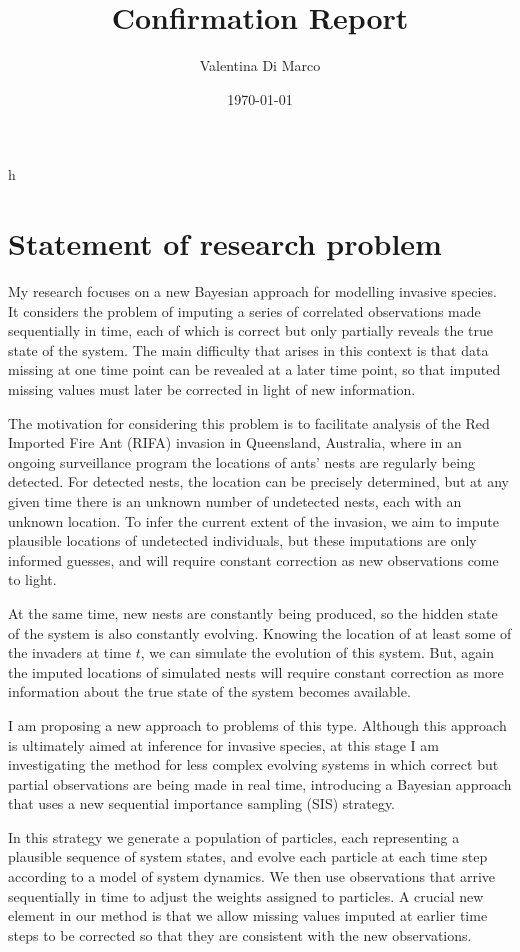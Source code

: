 h\documentclass[11pt,a4paper]{article}
\title{Confirmation Report}
\author{Valentina Di Marco}
\date{\today}
\begin{document}
 \maketitle

\section{Statement of research problem}

My research focuses on a new Bayesian approach for modelling invasive species. It considers the problem of imputing a series of correlated observations made sequentially in time, each of which is correct but only partially reveals the true state of the system. The main difficulty that arises in this context is that data missing at one time point can be revealed at a later time point, so that imputed missing values must later be corrected in light of new information.

The motivation for considering this problem is to facilitate analysis of the Red Imported Fire Ant (RIFA) invasion in Queensland, Australia, where in an ongoing surveillance program the locations of ants’ nests are regularly being detected. For detected nests, the location can be precisely determined, but at any given time there is an unknown number of undetected nests, each with an unknown location. To infer the current extent of the invasion, we aim to impute plausible locations of undetected individuals, but these imputations are only informed guesses, and will require constant correction as new observations come to light.

At the same time, new nests are constantly being produced, so the hidden state of the system is also constantly evolving. Knowing the location of at least some of the invaders at time $t$, we can simulate the evolution of this system. But, again the imputed locations of simulated nests will require constant correction as more information about the true state of the system becomes available.

I am proposing a new approach to problems of this type. Although this approach is ultimately aimed at inference for invasive species, at this stage I am investigating the method for less complex evolving systems in which correct but partial observations are being made in real time, introducing a Bayesian approach that uses a new sequential importance sampling (SIS) strategy. 

In this strategy we generate a population of particles, each representing a plausible sequence of system states, and evolve each particle at each time step according to a model of system dynamics. We then use observations that arrive sequentially in time to adjust the weights assigned to particles. A crucial new element in our method is that we allow missing values imputed at earlier time steps to be corrected so that they are consistent with the new observations.
\end{document}
